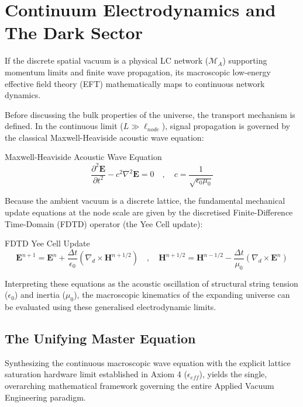 \chapter{Continuum Electrodynamics and The Dark Sector}
\label{ch:electrodynamics}

If the discrete spatial vacuum is a physical LC network ($\mathcal{M}_A$) supporting momentum limits and finite wave propagation, its macroscopic low-energy effective field theory (EFT) mathematically maps to continuous network dynamics. 

Before discussing the bulk properties of the universe, the transport mechanism is defined. In the continuous limit ($L \gg \ell_{node}$), signal propagation is governed by the classical Maxwell-Heaviside acoustic wave equation:
\begin{resultbox}{Maxwell-Heaviside Acoustic Wave Equation}
\begin{equation}
    \frac{\partial^2 \mathbf{E}}{\partial t^2} - c^2 \nabla^2 \mathbf{E} = 0 \quad , \quad c = \frac{1}{\sqrt{\epsilon_0 \mu_0}}
\end{equation}
\end{resultbox}

Because the ambient vacuum is a discrete lattice, the fundamental mechanical update equations at the node scale are given by the discretised Finite-Difference Time-Domain (FDTD) operator (the Yee Cell update):
\begin{resultbox}{FDTD Yee Cell Update}
\begin{equation}
    \mathbf{E}^{n+1} = \mathbf{E}^n + \frac{\Delta t}{\epsilon_0} (\nabla_d \times \mathbf{H}^{n+1/2}) \quad , \quad \mathbf{H}^{n+1/2} = \mathbf{H}^{n-1/2} - \frac{\Delta t}{\mu_0} (\nabla_d \times \mathbf{E}^n)
\end{equation}
\end{resultbox}

Interpreting these equations as the acoustic oscillation of structural string tension ($\epsilon_0$) and inertia ($\mu_0$), the macroscopic kinematics of the expanding universe can be evaluated using these generalised electrodynamic limits.

\section{The Unifying Master Equation}
Synthesizing the continuous macroscopic wave equation with the explicit lattice saturation hardware limit established in Axiom 4 ($\epsilon_{eff}$), yields the single, overarching mathematical framework governing the entire Applied Vacuum Engineering paradigm.

